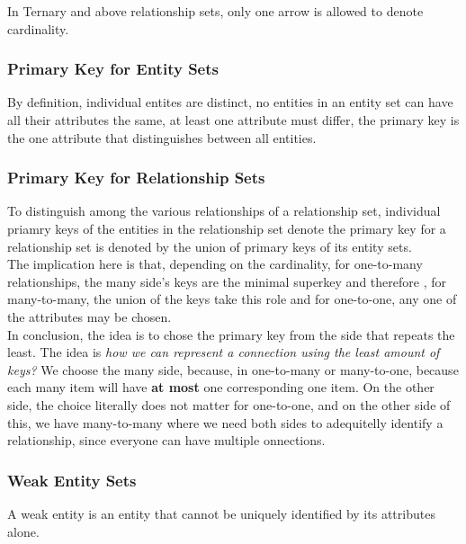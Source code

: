 \documentclass[11pt,a4paper,twocolumn]{book}
\begin{document}
In Ternary and above relationship sets, only one arrow is allowed to denote cardinality.

\subsubsection{Primary Key for Entity Sets}

By definition, individual entites are distinct, no entities in an entity set can have all their attributes the same, at least one attribute must differ, the primary key is the one attribute that distinguishes between all entities.

\subsubsection{Primary Key for Relationship Sets}

To distinguish among the various relationships of a relationship set, individual priamry keys of the entities in the relationship set denote the primary key for a relationship set is denoted by the union of primary keys of its entity sets.\\

The implication here is that, depending on the cardinality, for one-to-many relationships, the many side's keys are the minimal superkey and therefore , for many-to-many, the union of the keys take this role and for one-to-one, any one of the attributes may be chosen. \unsure \\

In conclusion, the idea is to chose the primary key from the side that repeats the least. The idea is \textit{how we can represent a connection using the least amount of keys?} We choose the many side, because, in one-to-many or many-to-one, because each many item will have \textbf{at most} one corresponding one item. On the other side, the choice literally does not matter for one-to-one, and on the other side of this, we have many-to-many where we need both sides to adequitelly identify a relationship, since everyone can have multiple onnections.

\subsubsection{Weak Entity Sets}

A weak entity is an entity that cannot be uniquely identified by its attributes alone.

\end{document}
